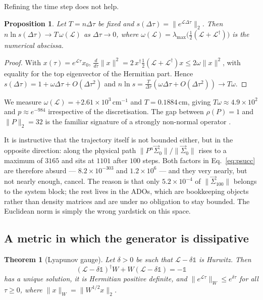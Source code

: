 \documentclass[aps,prx,twocolumn,superscriptaddress,nofootinbib,longbibliography]{revtex4-2}
\theoremstyle{plain}
\newtheorem{theorem}{Theorem}
\newtheorem{proposition}{Proposition}
\newcommand{\adj}{^{\dagger}}
\newcommand{\norm}[1]{\lVert#1\rVert}
\begin{document}
Refining the time step does not help.

\begin{proposition}
Let $T=n\Delta\tau$ be fixed and $s(\Delta\tau)=\norm{e^{\mathcal L\Delta\tau}}_2$.
Then $n\ln s(\Delta\tau)\to T\,\omega(\mathcal L)$ as $\Delta\tau\to0$, where
$\omega(\mathcal L)=\lambda_{\max}\big(\tfrac12(\mathcal L+\mathcal L\adj)\big)$
is the numerical abscissa.
\end{proposition}

\begin{proof}
With $x(\tau)=e^{\mathcal L\tau}x_0$,
$\tfrac{d}{d\tau}\norm{x}^2=2\,x\adj\tfrac12(\mathcal L+\mathcal L\adj)x
\le2\omega\norm{x}^2$, with equality for the top eigenvector of the Hermitian
part.  Hence $s(\Delta\tau)=1+\omega\Delta\tau+O(\Delta\tau^2)$ and
$n\ln s=\tfrac{T}{\Delta\tau}(\omega\Delta\tau+O(\Delta\tau^2))\to T\omega$.
\end{proof}

We measure $\omega(\mathcal L)=+2.61\times10^{3}\,\mathrm{cm}^{-1}$ and
$T=0.1884\,\mathrm{cm}$, giving $T\omega\approx4.9\times10^{2}$ and
$p\approx e^{-984}$ irrespective of the discretisation.  The gap between
$\rho(P)=1$ and $\norm{P}_2=32$ is the familiar signature of a strongly
non-normal operator \cite{Trefethen2005}.

It is instructive that the trajectory itself is not bounded either, but in the
opposite direction: along the physical path
$\norm{P^n\vec\Sigma_0}/\norm{\vec\Sigma_0}$ rises to a maximum of $3165$ and
sits at $1101$ after $100$ steps.  Both factors in Eq.~\eqref{eq:psucc} are
therefore absurd --- $8.2\times10^{-303}$ and $1.2\times10^{6}$ --- and they very
nearly, but not nearly enough, cancel.  The reason is that only
$5.2\times10^{-4}$ of $\norm{\vec\Sigma_{100}}$ belongs to the system block; the
rest lives in the ADOs, which are bookkeeping objects rather than density
matrices and are under no obligation to stay bounded.  The Euclidean norm is
simply the wrong yardstick on this space.

\subsection{A metric in which the generator is dissipative}

\begin{theorem}[Lyapunov gauge]
Let $\delta>0$ be such that $\mathcal L-\delta\mathbb 1$ is Hurwitz.  Then
\begin{equation}
(\mathcal L-\delta\mathbb 1)\adj W+W(\mathcal L-\delta\mathbb 1)=-\mathbb 1
\label{eq:lyap}
\end{equation}
has a unique solution, it is Hermitian positive definite, and
$\norm{e^{\mathcal L\tau}}_W\le e^{\delta\tau}$ for all $\tau\ge0$, where
$\norm{x}_W=\norm{W^{1/2}x}_2$.
\end{theorem}
\end{document}
